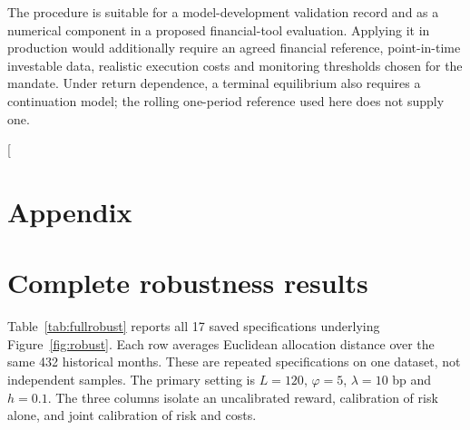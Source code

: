 \documentclass[sigconf,anonymous,review]{acmart}
\begin{document}
The procedure is suitable for a model-development validation record and as a numerical component in a proposed financial-tool evaluation. Applying it in production would additionally require an agreed financial reference, point-in-time investable data, realistic execution costs and monitoring thresholds chosen for the mandate. Under return dependence, a terminal equilibrium also requires a continuation model; the rolling one-period reference used here does not supply one.



\appendix
\twocolumn[{
\section*{Appendix}
\section{Complete robustness results}\label{app:robustness}
Table~\ref{tab:fullrobust} reports all 17 saved specifications underlying Figure~\ref{fig:robust}. Each row averages Euclidean allocation distance over the same 432 historical months. These are repeated specifications on one dataset, not independent samples. The primary setting is $L=120$, $\varphi=5$, $\lambda=10$ bp and $h=0.1$. The three columns isolate an uncalibrated reward, calibration of risk alone, and joint calibration of risk and costs.

}
\end{document}
